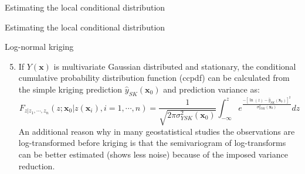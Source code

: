 \documentclass[8pt]{beamer}
\renewcommand{\emph}[1]{\textcolor{myorange}{#1}}
\begin{document}
\begin{frame}{Estimating the local conditional distribution}
\begin{itemize}
\begin{enumerate}
\begin{itemize}
                    \end{itemize}
            \end{enumerate}
    \end{itemize}
\end{frame}

\begin{frame}{Estimating the local conditional distribution}
     \begin{block}{Log-normal kriging}
    \end{block}
\begin{enumerate}
    \setcounter{enumi}{4} %
    \item If $Y(\mathbf{x})$ is \emph{multivariate Gaussian} distributed and \emph{stationary}, the \emph{conditional cumulative probability distribution function (ccpdf)} can be calculated from the \emph{simple kriging} prediction $\hat{y}_{SK}(\mathbf{x}_0)$ and prediction \emph{variance} as:
            \begin{equation}
                F_{z|z_1,\cdots,z_n} (z; \mathbf{x}_0 | z(\mathbf{x}_i), i=1,\cdots,n) = \frac{1}{\sqrt{2\pi \sigma_{YSK}^2 (\mathbf{x}_0)}} \int_{-\infty}^z e^{\frac{-\left[\ln(z)-\hat{y}_{SK}(\mathbf{x}_0) \right]^2}{\sigma_{YSK}^2 (\mathbf{x}_0)}} dz
                \label{e734}
            \end{equation}
            An additional reason why in many geostatistical studies the observations are \emph{log-transformed} before kriging is that the \emph{semivariogram} of log-transforms can be better estimated (shows less noise) because of the imposed \emph{variance} reduction.
\end{enumerate}
\end{frame}
\end{document}
